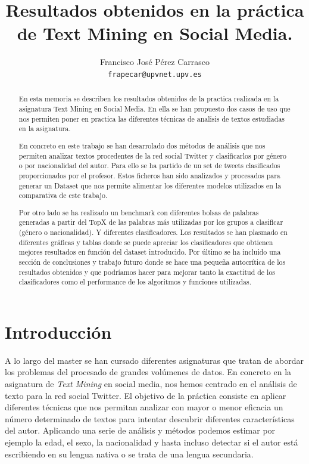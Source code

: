 \documentclass[11pt,a4paper]{article}
\title{Resultados obtenidos en la práctica de Text Mining en Social Media.}
\author{Francisco José Pérez Carrasco \\
  {\tt frapecar@upvnet.upv.es} \\}
\date{}
\begin{document}
\maketitle
\begin{abstract}
  En esta memoria se describen los resultados obtenidos de la practica realizada en la asignatura Text Mining en Social Media. En ella se han propuesto dos casos de uso que nos permiten poner en practica las diferentes técnicas de analisis de textos estudiadas en la asignatura. 
  
En concreto en este trabajo se han desarrolado dos métodos de análisis que nos permiten analizar textos procedentes de la red social Twitter y clasificarlos por género o por nacionalidad del autor.
Para ello se ha partido de un set de tweets clasificados proporcionados por el profesor. Estos ficheros han sido analizados y procesados para generar un Dataset que nos permite alimentar los diferentes modelos utilizados en la comparativa de este trabajo.

Por otro lado se ha realizado un benchmark con diferentes bolsas de palabras generadas a partir del TopX de las palabras más utilizadas por los grupos a clasificar (género o nacionalidad). Y diferentes clasificadores. Los resultados se han plasmado en diferentes gráficas y tablas donde se puede apreciar los clasificadores que obtienen mejores resultados en función del dataset introducido.
Por último se ha incluido una sección de conclusiones y trabajo futuro donde se hace una pequeña autocrítica de los resultados obtenidos y que podríamos hacer para mejorar tanto la exactitud de los clasificadores como el performance de los algoritmos y funciones utilizadas. 

\end{abstract}

\section{Introducción}

A lo largo del master se han cursado diferentes asignaturas que tratan de abordar los problemas del procesado de grandes volúmenes de datos. En concreto en la asignatura de \textit{Text Mining} en social media, nos hemos centrado en el análisis de texto para la red social Twitter. El objetivo de la práctica consiste en aplicar diferentes técnicas que nos permitan analizar con mayor o menor eficacia un número determinado de textos para intentar descubrir diferentes características del autor. Aplicando una serie de análisis y métodos podemos estimar por ejemplo la edad, el sexo, la nacionalidad y hasta incluso detectar si el autor está escribiendo en su lengua nativa o se trata de una lengua secundaria.
\end{document}

